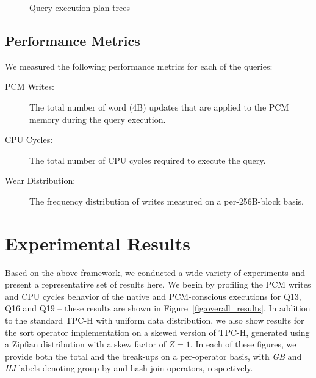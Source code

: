 \begin{figure}[t]
{
}

\caption{ Query execution plan trees}

\label{fig:plan_trees}

\end{figure}




\subsection{Performance Metrics}
We measured the following performance metrics for each of the queries:
\begin{description}


\item [PCM Writes:] The total number of word (4B) updates that are applied to the PCM memory during
the query execution.
\item [CPU Cycles:] The total number of CPU cycles required to execute the query.
\item [Wear Distribution:] The frequency distribution of writes measured on a per-256B-block basis.

\end{description}

\section{Experimental Results}
\label{sec:results}
Based on the above framework, we conducted a wide variety of experiments
and present a representative set of results here.  We begin by profiling the
PCM writes and CPU cycles behavior of
the native and PCM-conscious executions for Q13, Q16 and Q19 --
these results are shown in Figure~\ref{fig:overall_results}.  In addition to
the standard TPC-H
with uniform data distribution, we also show results for the sort operator
implementation on a skewed version of TPC-H, generated using a Zipfian distribution
\cite{vivekn} with a skew factor of $Z=1$. In each of these figures,
we provide
both the total and the break-ups on a per-operator basis, with \emph{GB} and
\emph{HJ} labels
denoting group-by and hash join operators, respectively.



